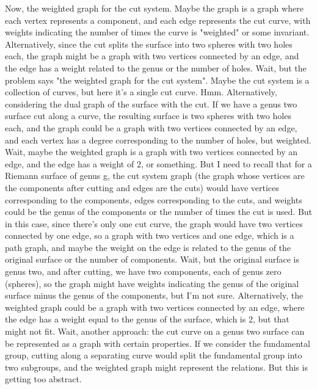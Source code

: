 Now, the weighted graph for the cut system. Maybe the graph is a graph where each vertex represents a component, and each edge represents the cut curve, with weights indicating the number of times the curve is "weighted" or some invariant. Alternatively, since the cut splits the surface into two spheres with two holes each, the graph might be a graph with two vertices connected by an edge, and the edge has a weight related to the genus or the number of holes. Wait, but the problem says "the weighted graph for the cut system". Maybe the cut system is a collection of curves, but here it's a single cut curve. Hmm. Alternatively, considering the dual graph of the surface with the cut. If we have a genus two surface cut along a curve, the resulting surface is two spheres with two holes each, and the graph could be a graph with two vertices connected by an edge, and each vertex has a degree corresponding to the number of holes, but weighted. Wait, maybe the weighted graph is a graph with two vertices connected by an edge, and the edge has a weight of 2, or something. But I need to recall that for a Riemann surface of genus g, the cut system graph (the graph whose vertices are the components after cutting and edges are the cuts) would have vertices corresponding to the components, edges corresponding to the cuts, and weights could be the genus of the components or the number of times the cut is used. But in this case, since there's only one cut curve, the graph would have two vertices connected by one edge, so a graph with two vertices and one edge, which is a path graph, and maybe the weight on the edge is related to the genus of the original surface or the number of components. Wait, but the original surface is genus two, and after cutting, we have two components, each of genus zero (spheres), so the graph might have weights indicating the genus of the original surface minus the genus of the components, but I'm not sure. Alternatively, the weighted graph could be a graph with two vertices connected by an edge, where the edge has a weight equal to the genus of the surface, which is 2, but that might not fit. Wait, another approach: the cut curve on a genus two surface can be represented as a graph with certain properties. If we consider the fundamental group, cutting along a separating curve would split the fundamental group into two subgroups, and the weighted graph might represent the relations. But this is getting too abstract. 

